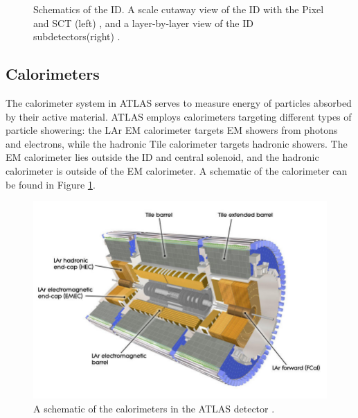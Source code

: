 \begin{figure}[!thp]
\begin{minipage}[c]{.45\textwidth}
    \end{minipage}
    \caption[Schematics of the \gls{ID}]{Schematics of the \gls{ID}. A scale cutaway view of the \gls{ID} with the Pixel and \gls{SCT} (left) \cite{pixel-electronics}, and a layer-by-layer view of the \gls{ID} subdetectors\footnotemark (right) \cite{id-perf2015}.}
\end{figure}
    

\subsection{Calorimeters} \label{ssec:calorimeters}
The calorimeter system in ATLAS serves to measure energy of particles absorbed by their active material. ATLAS employs calorimeters targeting different types of particle showering: the \gls{LAr} \gls{EM} calorimeter targets \gls{EM} showers from photons and electrons, while the hadronic Tile calorimeter targets hadronic showers. The \gls{EM} calorimeter lies outside the \gls{ID} and central solenoid, and the hadronic calorimeter is outside of the \gls{EM} calorimeter.  A schematic of the calorimeter can be found in Figure \ref{fig:calorimeter}.


\begin{figure}[!ht]
    \centering
    \includegraphics[width=.7\textwidth]{chapters/chapter2_experiment/images/calorimeter.jpeg}
    \caption{A schematic of the calorimeters in the ATLAS detector \cite{atlas-experiment}.}
    \label{fig:calorimeter}
\end{figure}

